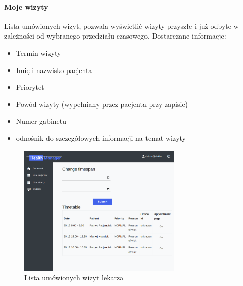 \documentclass[polish,12pt]{aghthesis}
\begin{document}
    \paragraph{Moje wizyty}{Lista umówionych wizyt, pozwala wyświetlić wizyty przyszłe i już odbyte w zależności od wybranego przedziału czasowego. Dostarczane informacje:
    \begin{itemize}
        \item Termin wizyty
        \item Imię i nazwisko pacjenta
        \item Priorytet
        \item Powód wizyty (wypełniany przez pacjenta przy zapisie)
        \item Numer gabinetu
        \item odnośnik do szczegółowych informacji na temat wizyty
    \end{itemize}
        \begin{figure}[H]
        \includegraphics[width=0.7\textwidth]{gui-doc-myvisits}
        \caption{Lista umówionych wizyt lekarza}
        \end{figure}    
    }
\end{document}
